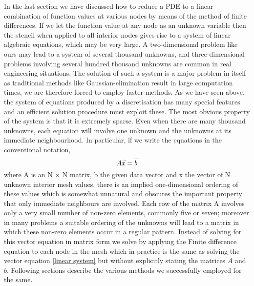 In the last section we have discussed how to reduce a PDE to a linear combination of function values at various nodes by means of the method of finite differences. If we let the function value at any node as an unknown variable then the stencil when applied to all interior nodes gives rise to a system of linear algebraic equations, which may be very large. A two-dimensional problem like ours may lead to a system of several thousand unknowns, and three-dimensional problems involving several hundred thousand unknowns are common in real engineering situations. The solution of such a system is a major problem in itself as traditional methods like Gaussian-elimination result in large computation times, we are therefore forced to employ faster methods. As we have seen above, the system of equations produced by a discretisation has many special features and an eﬃcient solution procedure must exploit these. The most obvious property of the system is that it is extremely sparse. Even when there are many thousand unknowns, each equation will involve one unknown and the unknowns at its immediate neighbourhood. In particular, if we write the equations in the conventional notation,
\begin{equation} \label{linear system}
    A \accentset{\rightharpoonup}{x} = \accentset{\rightharpoonup}{b} 
\end{equation}
where A is an N × N matrix, b the given data vector and x the vector of N unknown interior mesh values, there is an implied one-dimensional ordering of these values which is somewhat unnatural and obscures the important property that only immediate neighbours are involved. Each row of the matrix A involves only a very small number of non-zero elements, commonly ﬁve or seven; moreover in many problems a suitable ordering of the unknowns will lead to a matrix in which these non-zero elements occur in a regular pattern. Instead of solving for this vector equation in matrix form we solve by applying the Finite difference equation to each node in the mesh which in practice is the same as solving the vector equation \ref{linear system} but without explicitly stating the matrices $A$ and $b$. Following sections describe the various methods we successfully employed for the same.\autocite{mortonpde}\autocite{tudortmundkuzmin}
